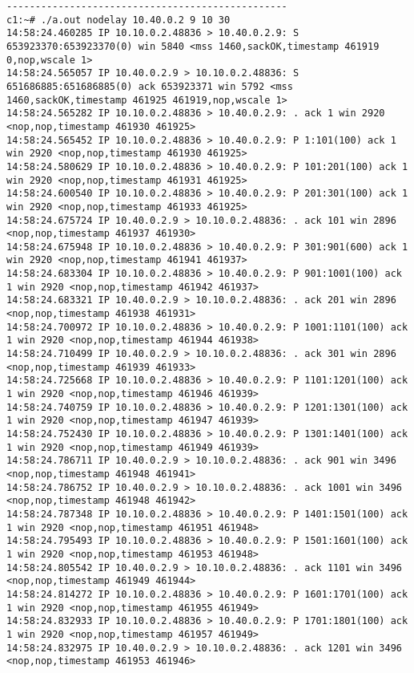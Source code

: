 \documentclass[a4paper,12pt]{article}
\begin{document}
\begin{lstlisting}
-------------------------------------------------
c1:~# ./a.out nodelay 10.40.0.2 9 10 30
14:58:24.460285 IP 10.10.0.2.48836 > 10.40.0.2.9: S 653923370:653923370(0) win 5840 <mss 1460,sackOK,timestamp 461919 0,nop,wscale 1>
14:58:24.565057 IP 10.40.0.2.9 > 10.10.0.2.48836: S 651686885:651686885(0) ack 653923371 win 5792 <mss 1460,sackOK,timestamp 461925 461919,nop,wscale 1>
14:58:24.565282 IP 10.10.0.2.48836 > 10.40.0.2.9: . ack 1 win 2920 <nop,nop,timestamp 461930 461925>
14:58:24.565452 IP 10.10.0.2.48836 > 10.40.0.2.9: P 1:101(100) ack 1 win 2920 <nop,nop,timestamp 461930 461925>
14:58:24.580629 IP 10.10.0.2.48836 > 10.40.0.2.9: P 101:201(100) ack 1 win 2920 <nop,nop,timestamp 461931 461925>
14:58:24.600540 IP 10.10.0.2.48836 > 10.40.0.2.9: P 201:301(100) ack 1 win 2920 <nop,nop,timestamp 461933 461925>
14:58:24.675724 IP 10.40.0.2.9 > 10.10.0.2.48836: . ack 101 win 2896 <nop,nop,timestamp 461937 461930> 
14:58:24.675948 IP 10.10.0.2.48836 > 10.40.0.2.9: P 301:901(600) ack 1 win 2920 <nop,nop,timestamp 461941 461937>
14:58:24.683304 IP 10.10.0.2.48836 > 10.40.0.2.9: P 901:1001(100) ack 1 win 2920 <nop,nop,timestamp 461942 461937>
14:58:24.683321 IP 10.40.0.2.9 > 10.10.0.2.48836: . ack 201 win 2896 <nop,nop,timestamp 461938 461931>
14:58:24.700972 IP 10.10.0.2.48836 > 10.40.0.2.9: P 1001:1101(100) ack 1 win 2920 <nop,nop,timestamp 461944 461938>
14:58:24.710499 IP 10.40.0.2.9 > 10.10.0.2.48836: . ack 301 win 2896 <nop,nop,timestamp 461939 461933>
14:58:24.725668 IP 10.10.0.2.48836 > 10.40.0.2.9: P 1101:1201(100) ack 1 win 2920 <nop,nop,timestamp 461946 461939>
14:58:24.740759 IP 10.10.0.2.48836 > 10.40.0.2.9: P 1201:1301(100) ack 1 win 2920 <nop,nop,timestamp 461947 461939>
14:58:24.752430 IP 10.10.0.2.48836 > 10.40.0.2.9: P 1301:1401(100) ack 1 win 2920 <nop,nop,timestamp 461949 461939>
14:58:24.786711 IP 10.40.0.2.9 > 10.10.0.2.48836: . ack 901 win 3496 <nop,nop,timestamp 461948 461941>
14:58:24.786752 IP 10.40.0.2.9 > 10.10.0.2.48836: . ack 1001 win 3496 <nop,nop,timestamp 461948 461942>
14:58:24.787348 IP 10.10.0.2.48836 > 10.40.0.2.9: P 1401:1501(100) ack 1 win 2920 <nop,nop,timestamp 461951 461948>
14:58:24.795493 IP 10.10.0.2.48836 > 10.40.0.2.9: P 1501:1601(100) ack 1 win 2920 <nop,nop,timestamp 461953 461948>
14:58:24.805542 IP 10.40.0.2.9 > 10.10.0.2.48836: . ack 1101 win 3496 <nop,nop,timestamp 461949 461944>
14:58:24.814272 IP 10.10.0.2.48836 > 10.40.0.2.9: P 1601:1701(100) ack 1 win 2920 <nop,nop,timestamp 461955 461949>
14:58:24.832933 IP 10.10.0.2.48836 > 10.40.0.2.9: P 1701:1801(100) ack 1 win 2920 <nop,nop,timestamp 461957 461949>
14:58:24.832975 IP 10.40.0.2.9 > 10.10.0.2.48836: . ack 1201 win 3496 <nop,nop,timestamp 461953 461946>

\end{lstlisting}
\end{document}
